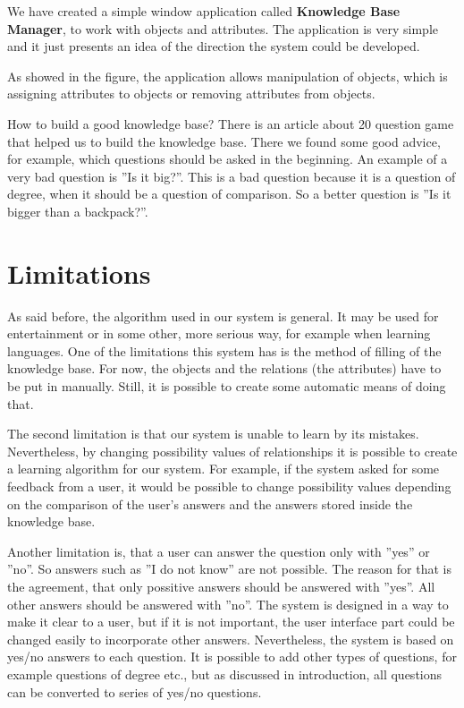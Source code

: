 \documentclass[a4paper]{article}
\begin{document}
We have created a simple window application called \textbf{Knowledge Base Manager}, to work with objects and attributes. The application is very simple and it just presents an idea of the direction the system could be developed.

    
As showed in the figure, the application allows manipulation of objects, which is assigning attributes to objects or removing attributes from objects.


How to build a good knowledge base? There is an article about 20 question game \citet{howToAskQuestions} that helped us to build the knowledge base. There we found some good advice, for example, which questions should be asked in the beginning. An example of a very bad question is ''Is it big?''. This is a bad question because it is a question of degree, when it should be a question of comparison. So a better question is ''Is it bigger than a backpack?''.

\section{Limitations}
As said before, the algorithm used in our system is general. It may be used for entertainment or in some other, more serious way, for example when learning languages. One of the limitations this system has is the method of filling of the knowledge base. For now, the objects and the relations (the attributes) have to be put in manually. Still, it is possible to create some automatic means of doing that.

The second limitation is that our system is unable to learn by its mistakes. Nevertheless, by changing possibility values of relationships it is possible to create a learning algorithm for our system. For example, if the system asked for some feedback from a user, it would be possible to change possibility values depending on the comparison of the user's answers and the answers stored inside the knowledge base. 

Another limitation is, that a user can answer the question only with ''yes'' or ''no''. So answers such as ''I do not know'' are not possible. The reason for that is the agreement, that only possitive answers should be answered with ''yes''. All other answers should be answered with ''no''. The system is designed in a way to make it clear to a user, but if it is not important, the user interface part could be changed easily to incorporate other answers. Nevertheless, the system is based on yes/no answers to each question. It is possible to add other types of questions, for example questions of degree etc., but as discussed in introduction, all questions can be converted to series of yes/no questions.
\end{document}
